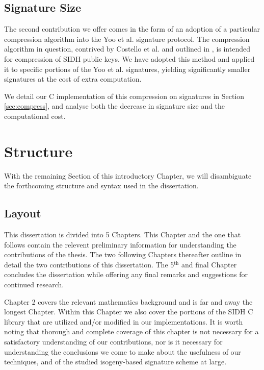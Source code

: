 \subsection{Signature Size}

The second contribution we offer comes in the form of an adoption of a particular compression algorithm into the Yoo et al. signature protocol. The compression algorithm in question, contrived by Costello et al. and outlined in \cite{pkcomp}, is intended for compression of SIDH public keys. We have adopted this method and applied it to specific portions of the Yoo et al. signatures, yielding significantly smaller signatures at the cost of extra computation.

We detail our C implementation of this compression on signatures in Section \ref{sec:compress}, and analyse both the decrease in signature size and the computational cost.

\section{Structure}

With the remaining Section of this introductory Chapter, we will disambiguate the forthcoming structure and syntax used in the dissertation.

\subsection{Layout}

This dissertation is divided into 5 Chapters. This Chapter and the one that follows contain the relevent preliminary information for understanding the contributions of the thesis. The two following Chapters thereafter outline in detail the two contributions of this dissertation. The 5$^{\text{th}}$ and final Chapter concludes the dissertation while offering any final remarks and suggestions for continued research.

Chapter 2 covers the relevant mathematics background and is far and away the longest Chapter. Within this Chapter we also cover the portions of the SIDH C library that are utilized and/or modified in our implementations. It is worth noting that thorough and complete coverage of this chapter is not necessary for a satisfactory understanding of our contributions, nor is it necessary for understanding the conclusions we come to make about the usefulness of our techniques, and of the studied isogeny-based signature scheme at large.

